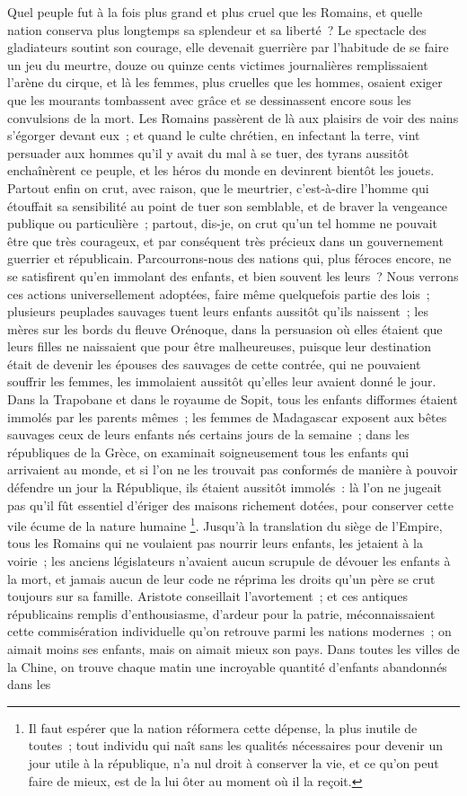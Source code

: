 \documentclass[french,twoside]{book} %
\begin{document}
Quel peuple fut à la fois plus grand et plus cruel que les Romains, et quelle nation conserva plus longtemps sa splendeur et sa liberté ? Le spectacle des gladiateurs soutint son courage, elle devenait guerrière par l’habitude de se faire un jeu du meurtre, douze ou quinze cents victimes journalières remplissaient l’arène du cirque, et là les femmes, plus cruelles que les hommes, osaient exiger que les mourants tombassent avec grâce et se dessinassent encore sous les convulsions de la mort. Les Romains passèrent de là aux plaisirs de voir des nains s’égorger devant eux ; et quand le culte chrétien, en infectant la terre, vint persuader aux hommes qu’il y avait du mal à se tuer, des tyrans aussitôt enchaînèrent ce peuple, et les héros du monde en devinrent bientôt les jouets. Partout enfin on crut, avec raison, que le meurtrier, c’est-à-dire l’homme qui étouffait sa sensibilité au point de tuer son semblable, et de braver la vengeance publique ou particulière ; partout, dis-je, on crut qu’un tel homme ne pouvait être que très courageux, et par conséquent très précieux dans un gouvernement guerrier et républicain. Parcourrons-nous des nations qui, plus féroces encore, ne se satisfirent qu’en immolant des enfants, et bien souvent les leurs ? Nous verrons ces actions universellement adoptées, faire même quelquefois partie des lois ; plusieurs peuplades sauvages tuent leurs enfants aussitôt qu’ils naissent ; les mères sur les bords du fleuve Orénoque, dans la persuasion où elles étaient que leurs filles ne naissaient que pour être malheureuses, puisque leur destination était de devenir les épouses des sauvages de cette contrée, qui ne pouvaient souffrir les femmes, les immolaient aussitôt qu’elles leur avaient donné le jour. Dans la Trapobane et dans le royaume de Sopit, tous les enfants difformes étaient immolés par les parents mêmes ; les femmes de Madagascar exposent aux bêtes sauvages ceux de leurs enfants nés certains jours de la semaine ; dans les républiques de la Grèce, on examinait soigneusement tous les enfants qui arrivaient au monde, et si l’on ne les trouvait pas conformés de manière à pouvoir défendre un jour la République, ils étaient aussitôt immolés : là l’on ne jugeait pas qu’il fût essentiel d’ériger des maisons richement dotées, pour conserver cette vile écume de la nature humaine \footnote{ Il faut espérer que la nation réformera cette dépense, la plus inutile de toutes ; tout individu qui naît sans les qualités nécessaires pour devenir un jour utile à la république, n’a nul droit à conserver la vie, et ce qu’on peut faire de mieux, est de la lui ôter au moment où il la reçoit.}. Jusqu’à la translation du siège de l’Empire, tous les Romains qui ne voulaient pas nourrir leurs enfants, les jetaient à la voirie ; les anciens législateurs n’avaient aucun scrupule de dévouer les enfants à la mort, et jamais aucun de leur code ne réprima les droits qu’un père se crut toujours sur sa famille. Aristote conseillait l’avortement ; et ces antiques républicains remplis d’enthousiasme, d’ardeur pour la patrie, méconnaissaient cette commisération individuelle qu’on retrouve parmi les nations modernes ; on aimait moins ses enfants, mais on aimait mieux son pays. Dans toutes les villes de la Chine, on trouve chaque matin une incroyable quantité d’enfants abandonnés dans les 
\end{document}
